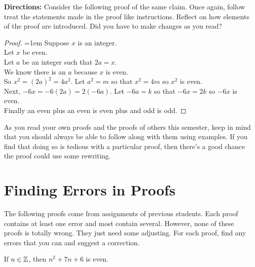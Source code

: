\noindent \textbf{Directions:}  Consider the following proof of the same claim.  Once again, follow treat the statements made in the proof like instructions.  Reflect on how elements of the proof are introduced.  Did you have to make changes as you read?

\begin{mdframed}[backgroundcolor=white]
\begin{proof} \openup=1em
Suppose $x$ is an integer.\\
Let $x$ be even.\\
Let $a$ be an integer such that $2a=x$.\\
We know there is an $a$ because $x$ is even.\\
So $x^2=(2a)^2=4a^2$.  Let $a^2=m$ so that $x^2=4m$ so $x^2$ is even.\\
Next, $-6x=-6(2a)=2(-6a)$.  Let $-6a=k$ so that $-6x=2k$ so $-6x$ is even.\\
Finally an even plus an even is even plus and odd is odd.
\vspace{.2in}
\end{proof}
\end{mdframed}

As you read your own proofs and the proofs of others this semester, keep in mind that you should always be able to follow along with them using examples.  If you find that doing so is tedious with a particular proof, then there's a good chance the proof could use some rewriting.

\section{Finding Errors in Proofs}
\noindent The following proofs come from assignments of previous students.  Each proof contains at least one error and most contain several.  However, none of these proofs is totally wrong.  They just need some adjusting.  For each proof, find any errors that you can and suggest a correction.\\


\begin{claim}
If $n \in \mathbb{Z}$, then $n^2+7n+6$ is even.
\end{claim}

